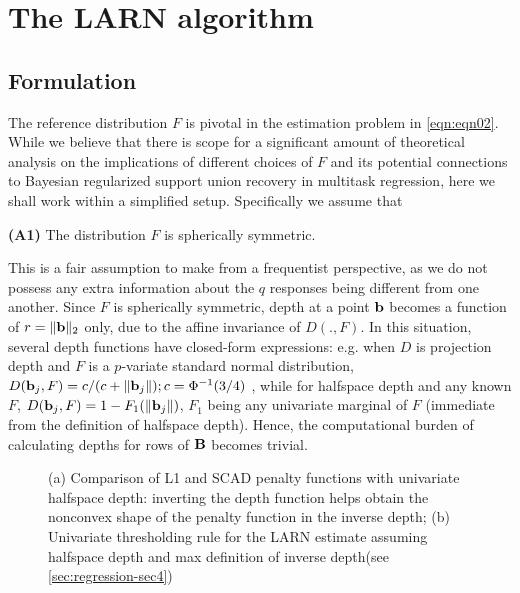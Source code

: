 \section{The LARN algorithm}
\label{sec:regression-sec3}

\subsection{Formulation}\label{subsec:subsec31}
The reference distribution $F$ is pivotal in the estimation problem in \ref{eqn:eqn02}. While we believe that there is scope for a significant amount of theoretical analysis on the implications of different choices of $F$ and its potential connections to Bayesian regularized support union recovery in multitask regression, here we shall work within a simplified setup. Specifically we assume that

\vspace{1em}
\noindent\textbf{(A1)} The distribution $F$ is spherically symmetric.
\vspace{1em}

\noindent This is a fair assumption to make from a frequentist perspective, as we do not possess any extra information about the $q$ responses being different from one another. Since $F$ is spherically symmetric, depth at a point ${\bf{b}}$ becomes a function of $r = \| {\bf{b}}\|_2$ only, due to the affine invariance of $D(.,F)$. In this situation, several depth functions have closed-form expressions: e.g. when $D$ is projection depth and $F$ is a $p$-variate standard normal distribution, $D({\bf{b}}_j, F) = c / (c + \| {\bf{b}}_j \|); c = \Phi^{-1}(3/4)$ \citep{zuo03}, while for halfspace depth and any known $F$, $D({\bf{b}}_j, F) = 1 - F_1(\| {\bf{b}}_j \|)$, $F_1$ being any univariate marginal of $F$ (immediate from the definition of halfspace depth). Hence, the computational burden of calculating depths for rows of ${\mathbf{B}}$ becomes trivial.

\begin{figure}
\vspace{-2em}
\begin{center}
\vspace{-1em}
\caption{(a) Comparison of L1 and SCAD \citep{FanLi01} penalty functions with univariate halfspace depth: inverting the depth function helps obtain the nonconvex shape of the penalty function in the inverse depth; (b) Univariate thresholding rule for the LARN estimate assuming halfspace depth and max definition of inverse depth(see \ref{sec:regression-sec4})}
\label{fig:fig1}
\end{center}
\end{figure}

